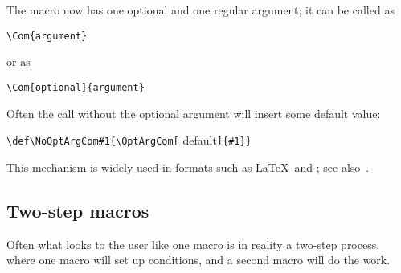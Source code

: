 \documentclass[letterpaper]{book}
\begin{document}
The macro  now has one optional and one regular
argument; it can be called as 
\begin{verbatim}
\Com{argument}
\end{verbatim}
or as
\begin{verbatim}
\Com[optional]{argument}
\end{verbatim}
Often the call without the optional argument will insert some
default value:
\begin{disp}\verb>\def\NoOptArgCom#1{\OptArgCom[>%
{\italic default\/}\verb>]{#1}}>\end{disp}
This mechanism is widely used in formats such as \LaTeX\ and
\LamsTeX; see also~\cite{svb:future}.



\subsection{Two-step macros}

Often what looks to the user like one macro is in reality
a two-step process, where one macro will set up conditions,
and a second macro will do the work.
\end{document}
